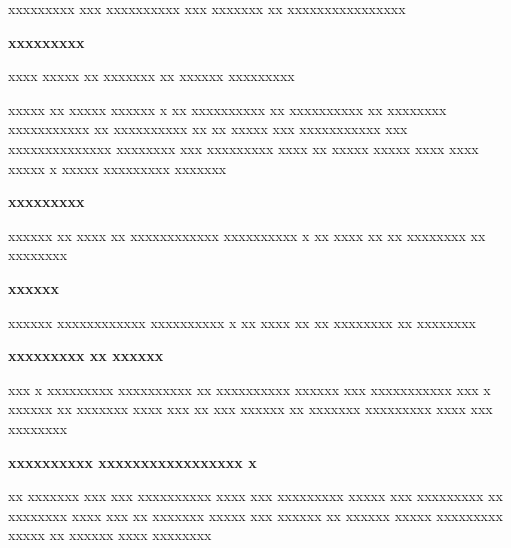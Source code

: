\documentclass[11pt,a4paper]{article}
\begin{document}
xxxxxxxxx xxx xxxxxxxxxx xxx xxxxxxx xx xxxxxxxxxxxxxxxx

\textbf{xxxxxxxxx}

xxxx xxxxx xx xxxxxxx xx xxxxxx xxxxxxxxx

xxxxx xx xxxxx xxxxxx x xx xxxxxxxxxx xx xxxxxxxxxx xx xxxxxxxx xxxxxxxxxxx xx xxxxxxxxxx xx xx xxxxx xxx xxxxxxxxxxx xxx xxxxxxxxxxxxxx xxxxxxxx xxx xxxxxxxxx xxxx xx xxxxx xxxxx xxxx xxxx xxxxx x xxxxx xxxxxxxxx xxxxxxx

\textbf{xxxxxxxxx}

xxxxxx xx xxxx xx xxxxxxxxxxxx xxxxxxxxxx x xx xxxx xx xx xxxxxxxx xx xxxxxxxx

\textbf{xxxxxx}

xxxxxx xxxxxxxxxxxx xxxxxxxxxx x xx xxxx xx xx xxxxxxxx xx xxxxxxxx

\textbf{xxxxxxxxx xx xxxxxx}

xxx x xxxxxxxxx xxxxxxxxxx xx xxxxxxxxxx xxxxxx xxx xxxxxxxxxxx xxx x xxxxxx xx xxxxxxx xxxx xxx xx xxx xxxxxx xx xxxxxxx xxxxxxxxx xxxx xxx xxxxxxxx

\textbf{xxxxxxxxxx xxxxxxxxxxxxxxxxx x}

xx xxxxxxx xxx xxx xxxxxxxxxx xxxx xxx xxxxxxxxx xxxxx xxx xxxxxxxxx xx xxxxxxxx xxxx xxx xx xxxxxxx xxxxx xxx xxxxxx xx xxxxxx xxxxx xxxxxxxxx xxxxx xx xxxxxx xxxx xxxxxxxx
\end{document}

